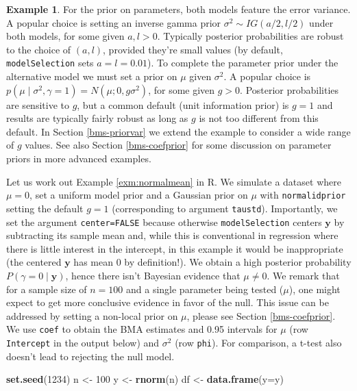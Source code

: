 \documentclass[
]{book}
\newenvironment{Shaded}{\begin{snugshade}}{\end{snugshade}}
\newcommand{\AttributeTok}[1]{\textcolor[rgb]{0.13,0.29,0.53}{#1}}
\newcommand{\DecValTok}[1]{\textcolor[rgb]{0.00,0.00,0.81}{#1}}
\newcommand{\FunctionTok}[1]{\textcolor[rgb]{0.13,0.29,0.53}{\textbf{#1}}}
\newcommand{\NormalTok}[1]{#1}
\newcommand{\OtherTok}[1]{\textcolor[rgb]{0.56,0.35,0.01}{#1}}
\newcommand{\by}{\mathbf{y}}
\theoremstyle{definition}
\theoremstyle{definition}
\newtheorem{example}{Example}[chapter]
\theoremstyle{definition}
\theoremstyle{definition}
\theoremstyle{remark}
\begin{document}
\begin{example}
For the prior on parameters, both models feature the error variance. A popular choice is setting an inverse gamma prior \(\sigma^2 \sim IG(a/2,l/2)\) under both models, for some given \(a,l>0\). Typically posterior probabilities are robust to the choice of \((a,l)\), provided they're small values (by default, \texttt{modelSelection} sets \(a=l=0.01\)).
To complete the parameter prior under the alternative model we must set a prior on \(\mu\) given \(\sigma^2\). A popular choice is \(p(\mu \mid \sigma^2, \gamma=1)= N(\mu; 0, g \sigma^2)\), for some given \(g>0\). Posterior probabilities are sensitive to \(g\), but a common default (unit information prior) is \(g=1\) and results are typically fairly robust as long as \(g\) is not too different from this default.
In Section \ref{bms-priorvar} we extend the example to consider a wide range of \(g\) values.
See also Section \ref{bms-coefprior} for some discussion on parameter priors in more advanced examples.
\end{example}

Let us work out Example \ref{exm:normalmean} in R. We simulate a dataset where \(\mu=0\), set a uniform model prior and a Gaussian prior on \(\mu\) with \texttt{normalidprior} setting the default \(g=1\) (corresponding to argument \texttt{taustd}).
Importantly, we set the argument \texttt{center=FALSE} because otherwise \texttt{modelSelection} centers \(\by\) by subtracting its sample mean and, while this is conventional in regression where there is little interest in the intercept, in this example it would be inappropriate (the centered \(\by\) has mean 0 by definition!).
We obtain a high posterior probability \(P(\gamma = 0 \mid \by)\), hence there isn't Bayesian evidence that \(\mu \neq 0\).
We remark that for a sample size of \(n=100\) and a single parameter being tested (\(\mu\)), one might expect to get more conclusive evidence in favor of the null. This issue can be addressed by setting a non-local prior on \(\mu\), please see Section \ref{bms-coefprior}.
We use \texttt{coef} to obtain the BMA estimates and 0.95 intervals for \(\mu\) (row \texttt{Intercept} in the output below) and \(\sigma^2\) (row \texttt{phi}).
For comparison, a t-test also doesn't lead to rejecting the null model.

\begin{Shaded}
\begin{Highlighting}[]
\FunctionTok{set.seed}\NormalTok{(}\DecValTok{1234}\NormalTok{)}
\NormalTok{n }\OtherTok{\textless{}{-}} \DecValTok{100}
\NormalTok{y }\OtherTok{\textless{}{-}} \FunctionTok{rnorm}\NormalTok{(n)}
\NormalTok{df }\OtherTok{\textless{}{-}} \FunctionTok{data.frame}\NormalTok{(}\AttributeTok{y=}\NormalTok{y)}
\end{Highlighting}
\end{Shaded}
\end{document}
